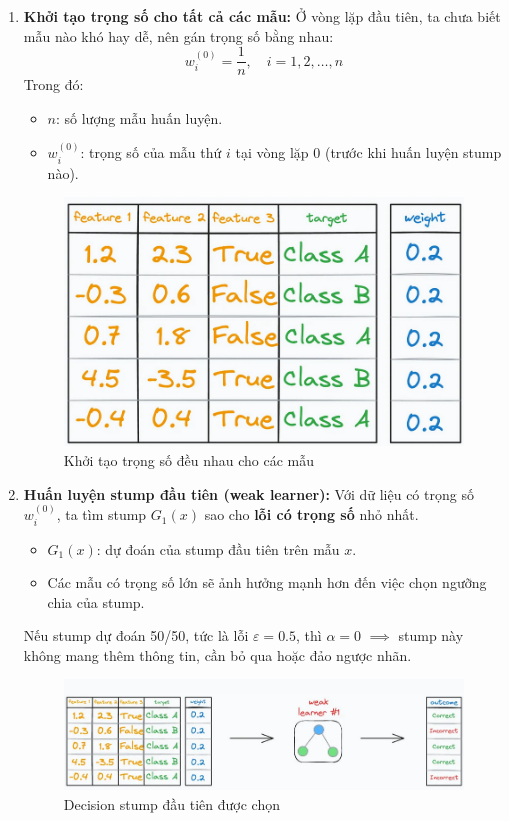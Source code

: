 \documentclass[11pt]{article}
\begin{document}
\begin{enumerate}
  \item \textbf{Khởi tạo trọng số cho tất cả các mẫu:}  
    Ở vòng lặp đầu tiên, ta chưa biết mẫu nào khó hay dễ, nên gán trọng số bằng nhau:  
    \[
    w_i^{(0)} = \frac{1}{n}, \quad i = 1, 2, \ldots, n
    \]  
    Trong đó:  
    \begin{itemize}
        \item \(n\): số lượng mẫu huấn luyện.  
        \item \(w_i^{(0)}\): trọng số của mẫu thứ \(i\) tại vòng lặp 0 (trước khi huấn luyện stump nào).  
    \end{itemize}

    \begin{figure}[H]
    \centering
    \includegraphics[width=0.7\linewidth]{images/ada_pipeline_2.png}
    \caption{Khởi tạo trọng số đều nhau cho các mẫu}
    \end{figure}
  
  \item \textbf{Huấn luyện stump đầu tiên (weak learner):}  
    Với dữ liệu có trọng số \(w_i^{(0)}\), ta tìm stump \(G_1(x)\) sao cho \textbf{lỗi có trọng số} nhỏ nhất.  
    \begin{itemize}
        \item \(G_1(x)\): dự đoán của stump đầu tiên trên mẫu \(x\).  
        \item Các mẫu có trọng số lớn sẽ ảnh hưởng mạnh hơn đến việc chọn ngưỡng chia của stump.  
    \end{itemize}

    Nếu stump dự đoán 50/50, tức là lỗi \(\varepsilon = 0.5\), thì \(\alpha = 0\) \(\implies\) stump này không mang thêm thông tin, cần bỏ qua hoặc đảo ngược nhãn.

    \begin{figure}[H]
    \centering
    \includegraphics[width=0.7\linewidth]{images/ada_pipeline_3.png}
    \caption{Decision stump đầu tiên được chọn}
    \end{figure}
  

\end{enumerate}
\end{document}
